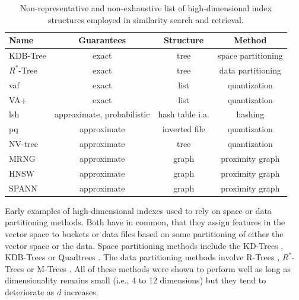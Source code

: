 \begin{table}
    \begin{tabular}{ | l | c | c | c |}
        \hline
        \textbf{Name} & \textbf{Guarantees} & \textbf{Structure} & \textbf{Method} \\
        \hline
        \hline
        KDB-Tree \cite{Robinson:1981KDB} & exact & tree & space partitioning \\  
        \hline
        $R^{*}$-Tree \cite{Beckmann:1990RTree} & exact & tree & data partitioning \\ 
        \hline
        \acrshort{vaf} \cite{Weber:1998Va} & exact & list & quantization \\ 
        \hline
        VA+ \cite{Ferhatosmanoglu:2000Vector} & exact & list & quantization \\ 
        \hline
        \acrshort{lsh} \cite{Indyk1998:Approximate, Wang:2017ASurvey} & approximate, probabilistic & hash table i.a.  & hashing \\ 
        \hline
        \acrshort{pq} \cite{Jegou:2010Product} & approximate & inverted file & quantization \\ 
        \hline
        NV-tree \cite{Lejsek:2009NVTree} & approximate & tree & quantization \\ 
        \hline
        MRNG \cite{Lejsek:2009NVTree} & approximate & graph & proximity graph \\ 
        \hline
        HNSW \cite{Malkov:2018Efficient} & approximate & graph & proximity graph \\ 
        \hline
        SPANN \cite{Chen:2021SPANN} & approximate & graph & proximity graph \\ 
        \hline
    \end{tabular}
    \caption{Non-representative and non-exhaustive list of high-dimensional index structures employed in similarity search and retrieval.}
    \label{table:index_structures}
\end{table}

Early examples of high-dimensional indexes used to rely on space or data partitioning methods. Both have in common, that they assign features in the vector space to buckets or data files based on some partitioning of either the vector space or the data. Space partitioning methods include the KD-Trees \cite{Bentley:1975Multidimensional}, KDB-Trees \cite{Robinson:1981KDB} or Quadtrees \cite{Finkel:1974Quad}. The data partitioning methods involve R-Trees \cite{Guttmann:1984RTrees}, $R^{*}$-Trees \cite{Beckmann:1990RTree} or M-Trees \cite{Ciaccia:1997Mtree}. All of these methods were shown to perform well as long as dimensionality remains small (i.e., 4 to 12 dimensions) but they tend to deteriorate as $d$ increases.

